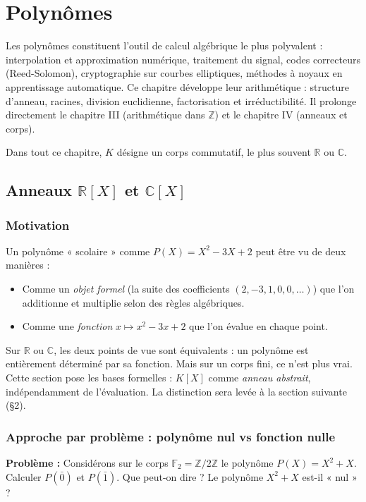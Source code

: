 \chapter{Polynômes}

Les polynômes constituent l'outil de calcul algébrique le plus polyvalent : interpolation et approximation numérique, traitement du signal, codes correcteurs (Reed-Solomon), cryptographie sur courbes elliptiques, méthodes à noyaux en apprentissage automatique. Ce chapitre développe leur arithmétique : structure d'anneau, racines, division euclidienne, factorisation et irréductibilité. Il prolonge directement le chapitre III (arithmétique dans $\mathbb{Z}$) et le chapitre IV (anneaux et corps).

Dans tout ce chapitre, $K$ désigne un corps commutatif, le plus souvent $\mathbb{R}$ ou $\mathbb{C}$.

\section{Anneaux $\mathbb{R}[X]$ et $\mathbb{C}[X]$}

\subsection{Motivation}
Un polynôme « scolaire » comme $P(X) = X^2 - 3X + 2$ peut être vu de deux manières :
\begin{itemize}
    \item Comme un \emph{objet formel} (la suite des coefficients $(2, -3, 1, 0, 0, \dots)$) que l'on additionne et multiplie selon des règles algébriques.
    \item Comme une \emph{fonction} $x \mapsto x^2 - 3x + 2$ que l'on évalue en chaque point.
\end{itemize}
Sur $\mathbb{R}$ ou $\mathbb{C}$, les deux points de vue sont équivalents : un polynôme est entièrement déterminé par sa fonction. Mais sur un corps fini, ce n'est plus vrai. Cette section pose les bases formelles : $K[X]$ comme \emph{anneau abstrait}, indépendamment de l'évaluation. La distinction sera levée à la section suivante (§2).

\subsection{Approche par problème : polynôme nul vs fonction nulle}
\textbf{Problème :} Considérons sur le corps $\mathbb{F}_2 = \mathbb{Z}/2\mathbb{Z}$ le polynôme $P(X) = X^2 + X$. Calculer $P(\bar{0})$ et $P(\bar{1})$. Que peut-on dire ? Le polynôme $X^2 + X$ est-il « nul » ?

